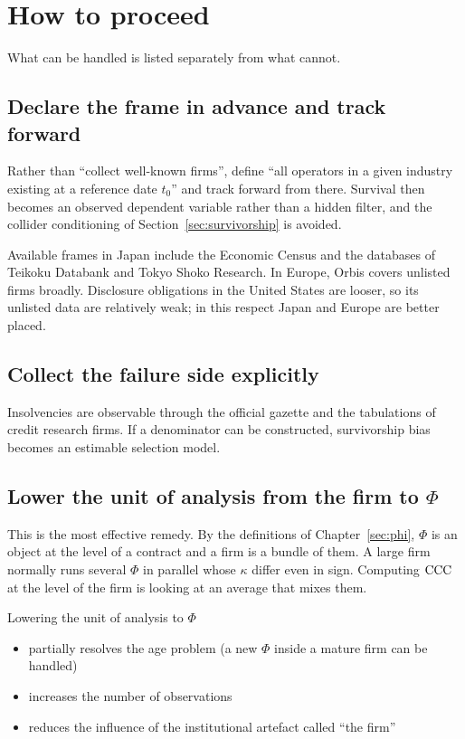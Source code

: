 \section{How to proceed}

What can be handled is listed separately from what cannot.

\subsection{Declare the frame in advance and track forward}

Rather than ``collect well-known firms'', define ``all operators in a given industry
existing at a reference date $t_0$'' and track forward from there. Survival then becomes an
observed dependent variable rather than a hidden filter, and the collider conditioning of
Section~\ref{sec:survivorship} is avoided.

Available frames in Japan include the Economic Census and the databases of Teikoku Databank
and Tokyo Shoko Research. In Europe, Orbis covers unlisted firms broadly. Disclosure
obligations in the United States are looser, so its unlisted data are relatively weak; in
this respect Japan and Europe are better placed.

\subsection{Collect the failure side explicitly}

Insolvencies are observable through the official gazette and the tabulations of credit
research firms. If a denominator can be constructed, survivorship bias becomes an estimable
selection model.

\subsection{Lower the unit of analysis from the firm to \texorpdfstring{$\Phi$}{Phi}}
\label{sec:unit}

This is the most effective remedy. By the definitions of Chapter~\ref{sec:phi}, $\Phi$ is an
object at the level of a contract and a firm is a bundle of them. A large firm normally runs
several $\Phi$ in parallel whose $\kappa$ differ even in sign. Computing $\mathrm{CCC}$ at the level
of the firm is looking at an average that mixes them.

Lowering the unit of analysis to $\Phi$
\begin{itemize}
\item partially resolves the age problem (a new $\Phi$ inside a mature firm can be handled)
\item increases the number of observations
\item reduces the influence of the institutional artefact called ``the firm''
\end{itemize}

